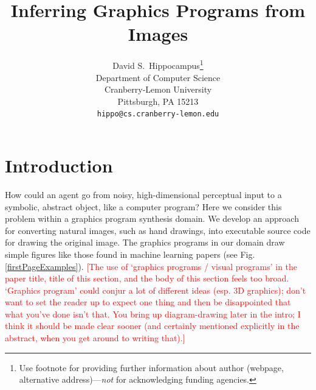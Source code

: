 \documentclass{article}
\title{Inferring Graphics Programs from Images}
\author{
  David S.~Hippocampus\thanks{Use footnote for providing further
    information about author (webpage, alternative
    address)---\emph{not} for acknowledging funding agencies.} \\
  Department of Computer Science\\
  Cranberry-Lemon University\\
  Pittsburgh, PA 15213 \\
  \texttt{hippo@cs.cranberry-lemon.edu} \\
}
\newcommand{\remark}[1]{\textcolor{red}{[#1]}}
\begin{document}

\maketitle

\begin{abstract}
\end{abstract}

\section{Introduction}

 How could an agent go from noisy, high-dimensional perceptual input
 to a symbolic, abstract object, like a computer program?  Here we
 consider this problem within a graphics program synthesis domain.  We
 develop an approach for converting natural images, such as hand
 drawings, into executable source code for drawing the original image.
 The graphics programs in our domain draw simple figures like those found in
 machine learning papers (see Fig.\ref{firstPageExamples}).
 \remark{The use of `graphics programs / visual programs' in the paper
   title, title of this section, and the body of this section feels
   too broad. `Graphics program' could conjur a lot of different ideas
   (esp. 3D graphics); don't want to set the reader up to expect one
   thing and then be disappointed that what you've done isn't
   that. You bring up diagram-drawing later in the intro; I think it
   should be made clear sooner (and certainly mentioned explicitly in
   the abstract, when you get around to writing that).}
\end{document}
